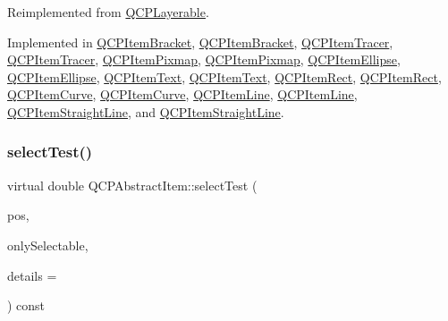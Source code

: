 Reimplemented from \hyperlink{class_q_c_p_layerable_a04db8351fefd44cfdb77958e75c6288e}{Q\+C\+P\+Layerable}.



Implemented in \hyperlink{class_q_c_p_item_bracket_a49a6b2f41e0a8c2a2e3a2836027a8455}{Q\+C\+P\+Item\+Bracket}, \hyperlink{class_q_c_p_item_bracket_ae0e06156ec6a11c8a0c4b6f8883c72a8}{Q\+C\+P\+Item\+Bracket}, \hyperlink{class_q_c_p_item_tracer_a9fd955fea40e977d66f3a9fd5765aec4}{Q\+C\+P\+Item\+Tracer}, \hyperlink{class_q_c_p_item_tracer_a690bdc69b630e01a16cdd03a883bebbf}{Q\+C\+P\+Item\+Tracer}, \hyperlink{class_q_c_p_item_pixmap_a65d1ede7bb479b90d40186d083071947}{Q\+C\+P\+Item\+Pixmap}, \hyperlink{class_q_c_p_item_pixmap_aa2919a96737ed02f643fe138fb830712}{Q\+C\+P\+Item\+Pixmap}, \hyperlink{class_q_c_p_item_ellipse_ab6e2b8a29695c606c7731e498297ca29}{Q\+C\+P\+Item\+Ellipse}, \hyperlink{class_q_c_p_item_ellipse_adae105786cd2f5dbc557c8846a0ec994}{Q\+C\+P\+Item\+Ellipse}, \hyperlink{class_q_c_p_item_text_a676aaec10ad3cc4d7d0e4847db04c838}{Q\+C\+P\+Item\+Text}, \hyperlink{class_q_c_p_item_text_ab9d7938a7445f16a00391e9355a5ceaa}{Q\+C\+P\+Item\+Text}, \hyperlink{class_q_c_p_item_rect_a2e68621b75bae4da6ae0ab2cdd0dd733}{Q\+C\+P\+Item\+Rect}, \hyperlink{class_q_c_p_item_rect_a9a19c1c6a0c4ad8cbd9c4cbe93d6e2ac}{Q\+C\+P\+Item\+Rect}, \hyperlink{class_q_c_p_item_curve_a718fa40140a43c8afbd41a3d85c92d72}{Q\+C\+P\+Item\+Curve}, \hyperlink{class_q_c_p_item_curve_a3633c02c3d753081ca26debd92f6cf3a}{Q\+C\+P\+Item\+Curve}, \hyperlink{class_q_c_p_item_line_a8e02bfbca04fbcf3dbc375a2bf693229}{Q\+C\+P\+Item\+Line}, \hyperlink{class_q_c_p_item_line_a6ab9156f12d5f4cf23bf24121c2bf97c}{Q\+C\+P\+Item\+Line}, \hyperlink{class_q_c_p_item_straight_line_a2e36c9d4dcc3aeda78a5584f790e39e3}{Q\+C\+P\+Item\+Straight\+Line}, and \hyperlink{class_q_c_p_item_straight_line_ab5058792781373379db1c3ddd3462576}{Q\+C\+P\+Item\+Straight\+Line}.

\mbox{\label{class_q_c_p_abstract_item_ae41d0349d68bb802c49104afd100ba2a}} 
\subsubsection{\texorpdfstring{select\+Test()}{selectTest()}\hspace{0.1cm}{\footnotesize\ttfamily [2/2]}}
{\footnotesize\ttfamily virtual double Q\+C\+P\+Abstract\+Item\+::select\+Test (\begin{DoxyParamCaption}\item[{const Q\+PointF \&}]{pos,  }\item[{bool}]{only\+Selectable,  }\item[{Q\+Variant $\ast$}]{details = {} }\end{DoxyParamCaption}) const\hspace{0.3cm}{\ttfamily [pure virtual]}}

